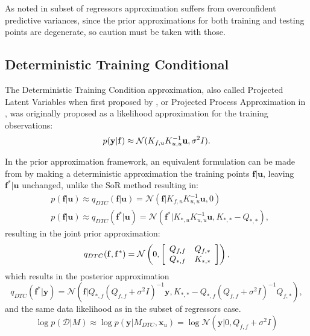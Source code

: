 As noted in \cite{Smola_2001} subset of regressors approximation suffers from overconfident predictive variances, since the prior approximations for both training and testing points are degenerate, so caution must be taken with those.

\subsection{Deterministic Training Conditional}

The Deterministic Training Condition approximation, also called Projected Latent Variables when first proposed by \cite{Seeger_2003}, or Projected Process Approximation in \cite{Rasmussen06}, was originally proposed as a likelihood approximation for the training observations:
\begin{equation}
p({\mathbf y}|{\mathbf f}) \approx \mathcal{N}(K_{f,u} K_{u,u}^{-1} {\mathbf u}, \sigma^2 I).
\end{equation}

In the prior approximation framework, an equivalent formulation can be made from by making a deterministic approximation the training points $\mathbf{f}|\mathbf{u}$, leaving $\mathbf{f}^*|\mathbf{u}$ unchanged, unlike the SoR method resulting in:
\begin{equation}
\begin{split}
& p(\mathbf{f}|\mathbf{u}) \approx q_{DTC}(\mathbf{f}|\mathbf{u}) = \mathcal{N}(\mathbf{f}|K_{f,u} K_{u,u}^{-1} \mathbf{u},0) \\
& p(\mathbf{f}|\mathbf{u}) \approx q_{DTC}(\mathbf{f}^*|\mathbf{u}) = \mathcal{N}(\mathbf{f}^{*}|K_{*,u} K_{u,u}^{-1} \mathbf{u},K_{*,*} - Q_{*,*}),
\end{split}
\end{equation}
resulting in the joint prior approximation:
\begin{equation}
q_{DTC}(\mathbf{f},\mathbf{f}^*) = \mathcal{N} 
\left( 0 , 
\left[ 
\begin{array}{c c} 
Q_{f,f}& Q_{f,*} \\
Q_{*,f} & K_{*,*}
\end{array} \right]\right),
\end{equation}
which results in the posterior approximation 
\begin{equation}\label{dtcprediction}
q_{DTC}(\mathbf{f}^*|\mathbf{y}) = \mathcal{N}(\mathbf{f}|Q_{*,f}(Q_{f,f} + \sigma^2 I)^{-1} \mathbf{y},K_{*,*} - Q_{*,f}(Q_{f,f} + \sigma^2 I)^{-1} Q_{f,*}),
\end{equation}
and the same data likelihood as in the subset of regressors case.
\begin{equation}\label{dtcobjective}
\log p(\mathcal{D}|M) \approx \log p(\mathbf{y}|M_{DTC},\mathbf{x}_u) = \log \mathcal{N}(\mathbf{y}|0,Q_{f,f} + \sigma^2 I)
\end{equation}

